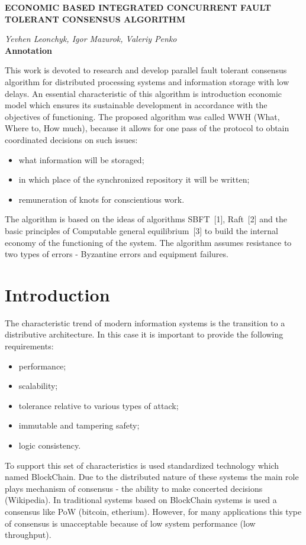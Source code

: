 \documentclass[12pt, a5paper]{article}
\begin{document}
\thispagestyle{empty}
\begin{center}
\bigskip
\textbf{\MakeUppercase{Economic Based Integrated Concurrent Fault Tolerant Consensus Algorithm}}
\medskip
\end{center}
\textit{Yevhen Leonchyk, Igor Mazurok, Valeriy Penko}
\\[0.5cm]
\textbf{\large{Annotation}}

\small{This work is devoted to research and develop parallel fault tolerant consensus algorithm for distributed processing systems and information storage with low delays. An essential characteristic of this algorithm is introduction economic model which ensures its sustainable development in accordance with the objectives of functioning. The proposed algorithm was called WWH (What, Where to, How much), because it allows for one pass of the protocol to obtain coordinated decisions on such issues:
\begin{itemize}
\item what information will be storaged;
\item in which place of the synchronized repository it will be written;
\item remuneration of knots for conscientious work.
\end{itemize}

The algorithm is based on the ideas of algorithms SBFT~[1], Raft~[2] and the basic principles of Computable general equilibrium~[3] 
to build the internal economy of the functioning of the system. The algorithm assumes resistance to two types of errors - Byzantine errors and equipment failures.}
\section{Introduction}

The characteristic trend of modern information systems is the transition to a distributive architecture. In this case it is important to provide the following requirements:
\begin{itemize}
\item performance;
\item scalability;
\item tolerance relative to various types of attack;
\item immutable and tampering safety;
\item logic consistency.
\end{itemize}

To support this set of characteristics is used standardized technology which named BlockChain. Due to the distributed nature of these systems the main role plays mechanism of consensus - the ability to make concerted decisions (Wikipedia). In traditional systems based on BlockChain systems is used a consensus like PoW (bitcoin, etherium). However, for many applications this type of consensus is unacceptable because of low system performance (low throughput).
\end{document}
